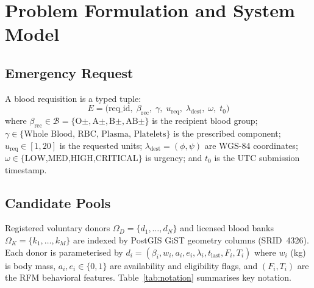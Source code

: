 \documentclass[conference]{IEEEtran}
\begin{document}
\section{Problem Formulation and System Model}

\subsection{Emergency Request}
A blood requisition is a typed tuple:
\begin{equation}
  E = \bigl(\mathrm{req\_id},\;\beta_\mathrm{rec},\;\gamma,\;
            u_\mathrm{req},\;\lambda_\mathrm{dest},\;\omega,\;t_0\bigr)
\end{equation}
where $\beta_\mathrm{rec}\!\in\!\mathcal{B}=\{\text{O}\pm,
\text{A}\pm,\text{B}\pm,\text{AB}\pm\}$ is the recipient blood group;
$\gamma\!\in\!\{\text{Whole Blood, RBC, Plasma, Platelets}\}$ is the
prescribed component; $u_\mathrm{req}\!\in\![1,20]$ is the requested
units; $\lambda_\mathrm{dest}=(\phi,\psi)$ are WGS-84 coordinates;
$\omega\!\in\!\{\text{LOW,MED,HIGH,CRITICAL}\}$ is urgency;
and $t_0$ is the UTC submission timestamp.

\subsection{Candidate Pools}
Registered voluntary donors $\Omega_D=\{d_1,\ldots,d_N\}$ and
licensed blood banks $\Omega_K=\{k_1,\ldots,k_M\}$ are indexed
by PostGIS GiST geometry columns (SRID~4326). Each donor is
parameterised by $d_i=(\beta_i,w_i,a_i,e_i,\lambda_i,t_\mathrm{last},
F_i,T_i)$ where $w_i$ (kg) is body mass, $a_i,e_i\!\in\!\{0,1\}$ are
availability and eligibility flags, and $(F_i,T_i)$ are the RFM
behavioral features. Table~\ref{tab:notation} summarises key notation.
\end{document}
